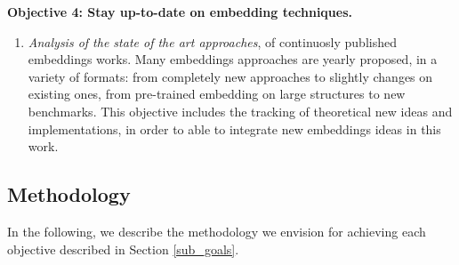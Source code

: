 \noindent\textbf{Objective 4: Stay up-to-date on embedding techniques.}
\begin{enumerate}
    \item \textit{Analysis of the state of the art approaches}, of continuosly published embeddings works. Many embeddings approaches are yearly proposed, in a variety of formats: from completely new approaches to slightly changes on existing ones, from pre-trained embedding on large structures to new benchmarks. This objective includes the tracking of theoretical new ideas and implementations, in order to able to integrate new embeddings ideas in this work.
\end{enumerate}





\subsection{Methodology}\label{sub_methodology}
In the following, we describe the methodology we envision for achieving each objective described in Section \ref{sub_goals}.

